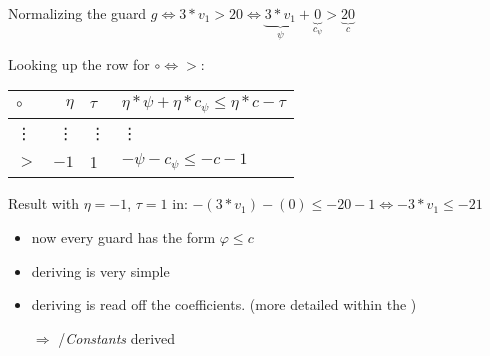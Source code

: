 \begin{frame} %
	\begin{example}
		Normalizing the guard $g \Leftrightarrow 3*v_1>20 \Leftrightarrow \underbrace{3*v_1}_{\psi}+\underbrace{0}_{c_\psi} > \underbrace{20}_{c}$ \vspace*{-1em}\newline
		
		Looking up the row for $\circ \Leftrightarrow >$: 
		\begin{tabular}{|l|r|l|l|}
			\hline
			$\circ$ 	& $\eta$ 	& $\tau$ 	&  $ \eta*\psi + \eta*c_{\psi} \le \eta*c-\tau$ \\ 
			\hline \hline
			\vdots 		& \vdots 	&  \vdots 		& \vdots \\ \hline
			$>$ 		& $-1$		&  1 		& $-\psi - c_{\psi} \le -c -1 $ \\ \hline
		\end{tabular} \newline
	
		Result with $\eta=-1$, $\tau = 1$ in: $-(3*v_1)-(0)\le-20-1 \Leftrightarrow -3*v_1 \le -21$
	\end{example}
\end{frame}

\begin{frame} %
	\begin{itemize}
		\item now every guard has the form $\varphi \le c$
		\item deriving \guardconstants is very simple
		\item deriving \guardmatrix is read off the coefficients.
		\hspace*{1.5cm}(more detailed within the \updatematrix)
		\item[$\Rightarrow$] \updatematrix/\textit{Constants} derived \checkmark
	\end{itemize}
\end{frame}

















